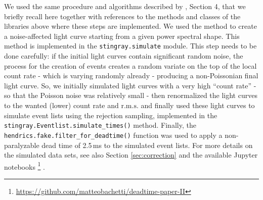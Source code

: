 \documentclass[twocolumn]{aastex61}
\newcommand{\rms}{\ensuremath{\mathrm{r.m.s.}}\xspace}
\begin{document}
We used the same procedure and algorithms described by \citet{Bachetti+15}, Section 4, that we briefly recall here together with references to the methods and classes of the libraries above where these steps are implemented.
We used the \citet{timmer1995} method to create a noise-affected light curve starting from a given power spectral shape. 
This method is implemented in the \texttt{stingray.simulate} module.
This step needs to be done carefully: if the initial light curves contain significant random noise, the process for the creation of events creates a random variate on the top of the local count rate - which is varying randomly already - producing a non-Poissonian final light curve. 
So, we initially simulated light curves with a very high ``count rate'' - so that the Poisson noise was relatively small - then renormalized the light curves to the wanted (lower) count rate and \rms and finally used these light curves to simulate event lists using the rejection sampling, implemented in the \texttt{stingray.Eventlist.simulate\_times()} method.
Finally, the \texttt{hendrics.fake.filter\_for\_deadtime()} function was used to apply a non-paralyzable dead time of 2.5\,ms to the simulated event lists. For more details on the simulated data sets, see also Section \ref{sec:correction} and the available Jupyter notebooks%
\footnote{\href{https://github.com/matteobachetti/deadtime-paper-II}{https://github.com/matteobachetti/deadtime-paper-II}} \citep[for a description of Jupyter notebooks, see][]{kluyver2016jupyter}.
\end{document}
